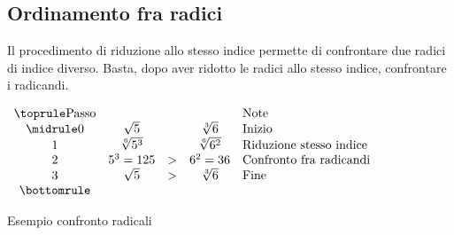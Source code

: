 \subsection{Ordinamento fra radici}
\label{sec:OrdinamentoFraRadici}
Il procedimento di riduzione allo stesso indice permette di confrontare due radici di indice diverso. Basta, dopo aver ridotto le radici allo stesso indice, confrontare i radicandi.
\begin{table}[H]
\centering
$
\begin{array}{ccccl}
\toprule
\text{Passo} &  &  &  &\text{Note} \\ 
\midrule
0 & \sqrt{5} &  &\sqrt[3]{6} & \text{Inizio} \\ 
1 & \sqrt[6]{5^3} &  &\sqrt[6]{6^2}  &\text{Riduzione stesso indice} \\ 
2 & 5^3=125 & > & 6^2=36 & \text{Confronto fra radicandi} \\ 
3 & \sqrt{5} & > & \sqrt[3]{6} & \text{Fine} \\
\bottomrule	
\end{array} 
$
\label{tab:confrontoradicali}
\caption{Esempio confronto radicali}
\end{table}

